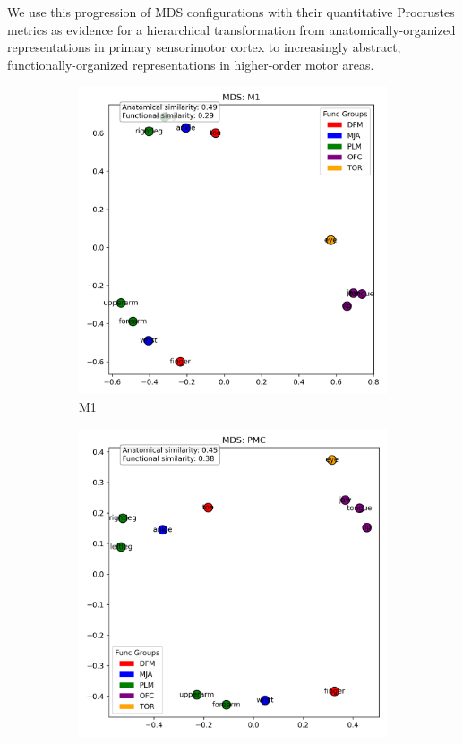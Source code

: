 \documentclass{article}
\begin{document}
We use this progression of MDS configurations with their quantitative Procrustes metrics as evidence for a hierarchical transformation from anatomically-organized representations in primary sensorimotor cortex to increasingly abstract, functionally-organized representations in higher-order motor areas.

\begin{figure}[!htbp]
    \centering
    \begin{subfigure}[b]{0.45\textwidth}
        \centering
        \includegraphics[width=\textwidth]{results/mds_m1.png}
        \caption{M1}
        \label{fig:mds_m1}
    \end{subfigure}
    \hfill
    \begin{subfigure}[b]{0.45\textwidth}
        \centering
        \includegraphics[width=\textwidth]{results/mds_pmc.png}

\end{subfigure}
\end{figure}
\end{document}
